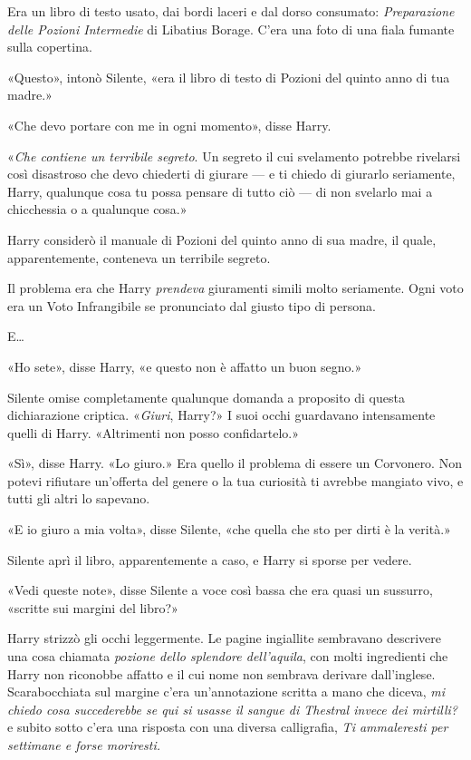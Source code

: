 Era un libro di testo usato, dai bordi laceri e dal dorso consumato: \textit{Preparazione delle Pozioni Intermedie} di Libatius Borage. C’era una foto di una fiala fumante sulla copertina.

«Questo», intonò Silente, «era il libro di testo di Pozioni del quinto anno di tua madre.»

«Che devo portare con me in ogni momento», disse Harry.

«\textit{Che contiene un terribile segreto}. Un segreto il cui svelamento potrebbe rivelarsi così disastroso che devo chiederti di giurare — e ti chiedo di giurarlo seriamente, Harry, qualunque cosa tu possa pensare di tutto ciò — di non svelarlo mai a chicchessia o a qualunque cosa.»

Harry considerò il manuale di Pozioni del quinto anno di sua madre, il quale, apparentemente, conteneva un terribile segreto.

Il problema era che Harry \textit{prendeva} giuramenti simili molto seriamente. Ogni voto era un Voto Infrangibile se pronunciato dal giusto tipo di persona.

E…

«Ho sete», disse Harry, «e questo non è affatto un buon segno.»

Silente omise completamente qualunque domanda a proposito di questa dichiarazione criptica. «\textit{Giuri}, Harry?» I suoi occhi guardavano intensamente quelli di Harry. «Altrimenti non posso confidartelo.»

«Sì», disse Harry. «Lo giuro.» Era quello il problema di essere un Corvonero. Non potevi rifiutare un’offerta del genere o la tua curiosità ti avrebbe mangiato vivo, e tutti gli altri lo sapevano.

«E io giuro a mia volta», disse Silente, «che quella che sto per dirti è la verità.»

Silente aprì il libro, apparentemente a caso, e Harry si sporse per vedere.

«Vedi queste note», disse Silente a voce così bassa che era quasi un sussurro, «scritte sui margini del libro?»

Harry strizzò gli occhi leggermente. Le pagine ingiallite sembravano descrivere una cosa chiamata \textit{pozione dello splendore dell’aquila}, con molti ingredienti che Harry non riconobbe affatto e il cui nome non sembrava derivare dall’inglese. Scarabocchiata sul margine c’era un’annotazione scritta a mano che diceva, \textit{mi chiedo cosa succederebbe se qui si usasse il sangue di Thestral invece dei mirtilli?} e subito sotto c’era una risposta con una diversa calligrafia, \textit{Ti ammaleresti per settimane e forse moriresti.}

